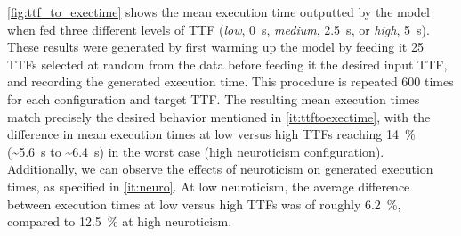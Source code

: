 \cref{fig:ttf_to_exectime} shows the mean execution time outputted by the model when fed three different levels of \ac{TTF} (\emph{low}, \SI{0}{\second}, \emph{medium}, \SI{2.5}{\second}, or \emph{high}, \SI{5}{\second}).
These results were generated by first warming up the model by feeding it \num{25} \acp{TTF} selected at random from the data before feeding it the desired input \ac{TTF}, and recording the generated execution time.
This procedure is repeated \num{600} times for each configuration and target \ac{TTF}.
The resulting mean execution times match precisely the desired behavior mentioned in \cref{it:ttftoexectime}, with the difference in mean execution times at low versus high \acp{TTF} reaching \SI{14}{\percent} (\textasciitilde\SI{5.6}{\second} to \textasciitilde\SI{6.4}{\second}) in the worst case (high neuroticism configuration).
Additionally, we can observe the effects of neuroticism on generated execution times, as specified in \cref{it:neuro}.
At low neuroticism, the average difference between execution times at low versus high \acp{TTF} was of roughly \SI{6.2}{\percent}, compared to \SI{12.5}{\percent} at high neuroticism.

